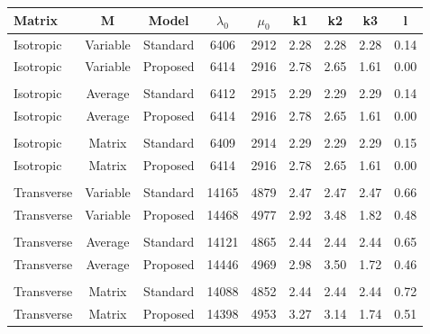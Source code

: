 \documentclass[a4paper,fleqn]{DC_ArtStyle}
\begin{document}
	\begin{table}[!hb]
		\begin{tabular}{l|c|c|c|c|c|c|c|c}
			Matrix & M & Model & $\lambda_0$ & $\mu_0$ & k1 & k2 & k3 & l \\
			\hline
			\rowcolor[RGB]{240,240,240}
			Isotropic & Variable & Standard & 6406 & 2912 & 2.28 & 2.28 & 2.28 & 0.14 \\
			\rowcolor[RGB]{240,240,240}
			Isotropic & Variable & Proposed & 6414 & 2916 & 2.78 & 2.65 & 1.61 & 0.00 \\
			&&&&&&&&\\[-0.5em]
			Isotropic & Average & Standard & 6412 & 2915 & 2.29 & 2.29 & 2.29 & 0.14 \\
			Isotropic & Average & Proposed & 6414 & 2916 & 2.78 & 2.65 & 1.61 & 0.00 \\
			&&&&&&&&\\[-0.5em]
			Isotropic & Matrix & Standard & 6409 & 2914 & 2.29 & 2.29 & 2.29 & 0.15 \\
			Isotropic & Matrix & Proposed & 6414 & 2916 & 2.78 & 2.65 & 1.61 & 0.00 \\
			&&&&&&&&\\[-0.5em]
			\rowcolor[RGB]{240,240,240}
			Transverse & Variable & Standard & 14165 & 4879 & 2.47 & 2.47 & 2.47 & 0.66 \\
			\rowcolor[RGB]{240,240,240}
			Transverse & Variable & Proposed & 14468 & 4977 & 2.92 & 3.48 & 1.82 & 0.48 \\
			&&&&&&&&\\[-0.5em]
			Transverse & Average & Standard & 14121 & 4865 & 2.44 & 2.44 & 2.44 & 0.65 \\
			Transverse & Average & Proposed & 14446 & 4969 & 2.98 & 3.50 & 1.72 & 0.46 \\
			&&&&&&&&\\[-0.5em]
			Transverse & Matrix & Standard & 14088 & 4852 & 2.44 & 2.44 & 2.44 & 0.72 \\
			Transverse & Matrix & Proposed & 14398 & 4953 & 3.27 & 3.14 & 1.74 & 0.51 \\
			\hline
		\end{tabular}
	\end{table}
\end{document}
